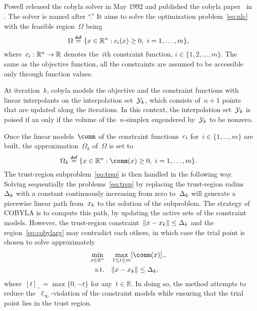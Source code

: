 \documentclass[11pt,draft]{article}
\numberwithin{equation}{section}
\newcommand{\R}{\mathbb{R}}
\newcommand{\norm}[2][]{#1\lVert#2#1\rVert}
\newcommand{\set}[2][]{#1\{#2#1\}}
\newcommand{\eqdef}{\mathrel{\stackrel{\mathsf{def}}{=}}}
\newcommand{\con}[1][i]{c\ifthenelse{\equal{#1}{}}{}{_{#1}}}
\newcommand{\fset}{\Omega}
\newcommand{\fsetm}[1][k]{\Omega_{#1}}
\newcommand{\iter}[1][k]{x\ifthenelse{\equal{#1}{}}{}{_{#1}}}
\newcommand{\rad}[1][k]{\Delta\ifthenelse{\equal{#1}{}}{}{_{#1}}}
\newcommand{\st}{\text{s.t.}}
\newcommand{\xpt}[1][k]{\mathcal{Y}\ifthenelse{\equal{#1}{}}{}{_{#1}}}
\begin{document}
\subsection{}
\label{ssec:cobyla}

Powell released the \gls{cobyla} solver in May 1992 and published the \gls{cobyla}
paper~\cite{Powell_1994} in .
The solver is named after \enquote{.}
It aims to solve the optimization problem~\cref{eq:nlc} with the feasible region~$\fset$ being
\begin{equation*}
    \fset \eqdef \set{x \in \R^n : \con(x) \ge 0, ~ i = 1, \dots, m},
\end{equation*}
where~$\con : \R^n \to \R$ denotes the~$i$th constraint function, $i \in \set{1, 2, \dots, m}$.
The same as the objective function, all the constraints are assumed to be accessible only through function values.

At iteration~$k$, \gls{cobyla} models the objective and the constraint functions with {linear} interpolants on the interpolation set~$\xpt$, which consists of~$n + 1$ points that are updated along the iterations.
In this context, the interpolation set~$\xpt$ is poised if an only if the volume of the~$n$-simplex engendered by~$\xpt$ to be nonzero.

Once the linear models~$\conm$ of the constraint functions~$\con$ for~$i \in \set{1, \dots, m}$ are built, the approximation~$\fsetm$ of~$\fset$ is set to
\begin{equation}
    \label{eq:cobylarg}
    \fsetm \eqdef \set{x \in \R^n : \conm(x) \ge 0, ~ i=1, \dots, m}.
\end{equation}
The trust-region subproblem~\cref{eq:trsp} is then handled in the following way.
Solving sequentially the problems~\cref{eq:trsp} by replacing the trust-region radius~$\rad$ with a constant continuously increasing from zero to~$\rad$ will generate a piecewise linear path from~$\iter$ to the solution of the subproblem.
The strategy of COBYLA is to compute this path, by updating the active sets of the constraint models.
However, the trust-region constraint~$\norm{x - \iter} \le \rad$ and the region~\cref{eq:cobylarg} may contradict each others, in which case the trial point is chosen to solve approximately
\begin{align*}
    \min_{x \in \R^n}   & \quad \max_{1 \le i \le m} [\conm(x)]_{-}\\
    \st                 & \quad \norm{x - \iter} \le \rad,
\end{align*}
where~$[t]_{-} = \max \set{0, -t}$ for any~$t\in \R$.
In doing so, the method attempts to reduce the~$\ell_\infty$-violation of the constraint models while ensuring that the trial point lies in the trust region.
\end{document}
